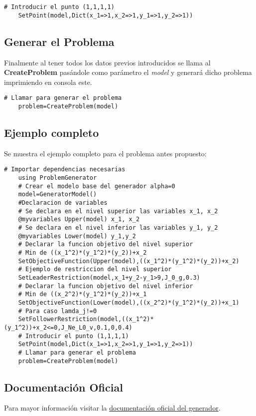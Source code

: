 \begin{lstlisting}[caption={Introducir el punto $(1,1,1,1)$}]
    # Introducir el punto (1,1,1,1)
    SetPoint(model,Dict(x_1=>1,x_2=>1,y_1=>1,y_2=>1))
\end{lstlisting}

\subsection{Generar el Problema}
Finalmente al tener todos los datos previos introducidos se llama al \textbf{CreateProblem} pasándole como parámetro el \textit{model} 
y generará dicho problema imprimiendo en consola este.

\begin{lstlisting}[caption={Generar el problema}]
    # Llamar para generar el problema
    problem=CreateProblem(model)
\end{lstlisting}
\begin{samepage}
    
\subsection{Ejemplo completo}
Se muestra el ejemplo completo para el problema antes propuesto:
\begin{lstlisting}[caption={Script}]
    # Importar dependencias necesarias
    using ProblemGenerator
    # Crear el modelo base del generador alpha=0
    model=GeneratorModel()
    #Declaracion de variables
    # Se declara en el nivel superior las variables x_1, x_2
    @myvariables Upper(model) x_1, x_2
    # Se declara en el nivel inferior las variables y_1, y_2
    @myvariables Lower(model) y_1,y_2
    # Declarar la funcion objetivo del nivel superior
    # Min de ((x_1^2)*(y_1^2)*(y_2))+x_2
    SetObjectiveFunction(Upper(model),((x_1^2)*(y_1^2)*(y_2))+x_2)
    # Ejemplo de restriccion del nivel superior
    SetLeaderRestriction(model,x_1+y_2-y_1>9,J_0_g,0.3)
    # Declarar la funcion objetivo del nivel inferior
    # Min de ((x_2^2)*(y_1^2)*(y_2))+x_1
    SetObjectiveFunction(Lower(model),((x_2^2)*(y_1^2)*(y_2))+x_1)
    # Para caso lamda_j!=0
    SetFollowerRestriction(model,((x_1^2)*(y_1^2))+x_2<=0,J_Ne_L0_v,0.1,0,0.4)
    # Introducir el punto (1,1,1,1)
    SetPoint(model,Dict(x_1=>1,x_2=>1,y_1=>1,y_2=>1))
    # Llamar para generar el problema
    problem=CreateProblem(model)
\end{lstlisting}

\end{samepage}
\subsection{Documentación Oficial}
Para mayor información visitar la \href{https://fvsb.github.io/Tesis/}{documentación oficial del generador}. 


